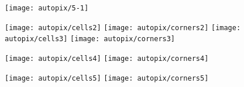 \documentclass[12pt]{article}
\begin{document}
\texttt{[image: autopix/5-1]}%

\newpage
\texttt{[image: autopix/cells2]}%
\texttt{[image: autopix/corners2]}%
\texttt{[image: autopix/cells3]}%
\texttt{[image: autopix/corners3]}%

\texttt{[image: autopix/cells4]}%
\texttt{[image: autopix/corners4]}%

\texttt{[image: autopix/cells5]}%
\texttt{[image: autopix/corners5]}%
\end{document}

